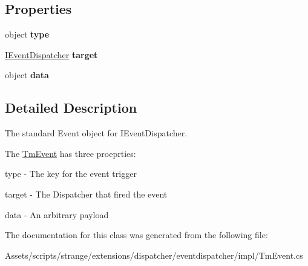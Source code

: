\subsection*{Properties}
\begin{DoxyCompactItemize}
\item 
\hypertarget{classstrange_1_1extensions_1_1dispatcher_1_1eventdispatcher_1_1impl_1_1_tm_event_a76779732b987bf2d611735a6e6c328f6}{object {\bfseries type}}\label{classstrange_1_1extensions_1_1dispatcher_1_1eventdispatcher_1_1impl_1_1_tm_event_a76779732b987bf2d611735a6e6c328f6}

\item 
\hypertarget{classstrange_1_1extensions_1_1dispatcher_1_1eventdispatcher_1_1impl_1_1_tm_event_a4fad0978eb6dd43804c35390f96c23a6}{\hyperlink{interfacestrange_1_1extensions_1_1dispatcher_1_1eventdispatcher_1_1api_1_1_i_event_dispatcher}{I\-Event\-Dispatcher} {\bfseries target}}\label{classstrange_1_1extensions_1_1dispatcher_1_1eventdispatcher_1_1impl_1_1_tm_event_a4fad0978eb6dd43804c35390f96c23a6}

\item 
\hypertarget{classstrange_1_1extensions_1_1dispatcher_1_1eventdispatcher_1_1impl_1_1_tm_event_a2a7919deb2f3212dd0bcbf2ce86624fb}{object {\bfseries data}}\label{classstrange_1_1extensions_1_1dispatcher_1_1eventdispatcher_1_1impl_1_1_tm_event_a2a7919deb2f3212dd0bcbf2ce86624fb}

\end{DoxyCompactItemize}


\subsection{Detailed Description}
The standard Event object for I\-Event\-Dispatcher. 

The \hyperlink{classstrange_1_1extensions_1_1dispatcher_1_1eventdispatcher_1_1impl_1_1_tm_event}{Tm\-Event} has three proeprties\-: 
\begin{DoxyItemize}
\item type -\/ The key for the event trigger 
\item target -\/ The Dispatcher that fired the event 
\item data -\/ An arbitrary payload 
\end{DoxyItemize}

The documentation for this class was generated from the following file\-:\begin{DoxyCompactItemize}
\item 
Assets/scripts/strange/extensions/dispatcher/eventdispatcher/impl/Tm\-Event.\-cs\end{DoxyCompactItemize}
